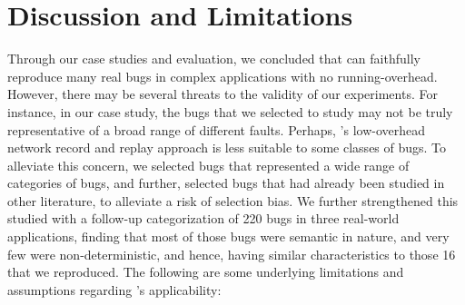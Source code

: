 
\section{Discussion and Limitations}
\label{sec:parikshanThreats}

Through our case studies and evaluation, we concluded that \parikshan can faithfully reproduce many real bugs in complex applications with no running-overhead.
However, there may be several threats to the validity of our experiments.
For instance, in our case study, the bugs that we selected to study may not be truly representative of a broad range of different faults.
Perhaps, \parikshan's low-overhead network record and replay approach is less suitable to some classes of bugs.
To alleviate this concern, we selected bugs that represented a wide range of categories of bugs, and further, selected bugs that had already been studied in other literature, to alleviate a risk of selection bias.
We further strengthened this studied with a follow-up categorization of 220 bugs in three real-world applications, finding that most of those bugs were semantic in nature, and very few were non-deterministic, and hence, having similar characteristics to those 16 that we reproduced. The following are some underlying limitations and assumptions regarding \parikshan's applicability:



